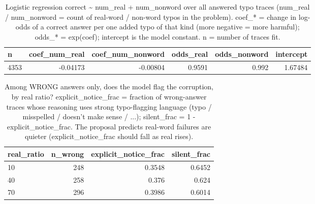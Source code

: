 \documentclass[11pt]{article}
\begin{document}
\begin{table}[H]
\centering
\caption{Logistic regression correct \textasciitilde{} num\_real + num\_nonword over all answered typo traces (num\_real / num\_nonword = count of real-word / non-word typos in the problem). coef\_* = change in log-odds of a correct answer per one added typo of that kind (more negative = more harmful); odds\_* = exp(coef); intercept is the model constant. n = number of traces fit.}
\small
\begin{adjustbox}{max width=\textwidth}
\begin{tabular}{lrrrrr}
\toprule
\textbf{n} & \textbf{coef\_num\_real} & \textbf{coef\_num\_nonword} & \textbf{odds\_real} & \textbf{odds\_nonword} & \textbf{intercept} \\
\midrule
4353 & -0.04173 & -0.00804 & 0.9591 & 0.992 & 1.67484 \\
\bottomrule
\end{tabular}
\end{adjustbox}
\end{table}

\begin{table}[H]
\centering
\caption{Among WRONG answers only, does the model flag the corruption, by real ratio? explicit\_notice\_frac = fraction of wrong-answer traces whose reasoning uses strong typo-flagging language (typo / misspelled / doesn't make sense / ...); silent\_frac = 1 - explicit\_notice\_frac. The proposal predicts real-word failures are quieter (explicit\_notice\_frac should fall as real rises).}
\small
\begin{adjustbox}{max width=\textwidth}
\begin{tabular}{lrrr}
\toprule
\textbf{real\_ratio} & \textbf{n\_wrong} & \textbf{explicit\_notice\_frac} & \textbf{silent\_frac} \\
\midrule
10 & 248 & 0.3548 & 0.6452 \\
40 & 258 & 0.376 & 0.624 \\
70 & 296 & 0.3986 & 0.6014 \\
\bottomrule
\end{tabular}
\end{adjustbox}
\end{table}
\end{document}

